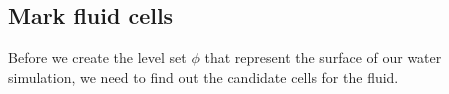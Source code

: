 \subsection{Mark fluid cells}

Before we create the level set $\phi$ that represent the surface of our water simulation, we need to find out the candidate cells for the fluid.
